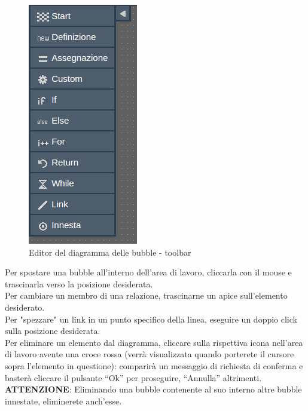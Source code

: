 \documentclass[../ManualeUtente.tex]{subfiles}
\begin{document}
				\begin{figure} [h!]
					\centering
					\includegraphics[scale=0.36]{./Immagini/ToolbarBubbleDiag.png}
					\caption{Editor del diagramma delle bubble - toolbar}\label{fig:ToolbarBubbleDiag}
				\end{figure}
				Per spostare una bubble all'interno dell'area di lavoro,
				cliccarla con il mouse e trascinarla verso la posizione desiderata.\\
				Per cambiare un membro di una relazione, trascinarne un apice sull'elemento
				desiderato.\\
				Per "spezzare" un link in un punto specifico della linea, eseguire un doppio click sulla
				posizione desiderata.\\
				Per eliminare un elemento dal diagramma, cliccare sulla rispettiva icona nell'area di lavoro
				avente una croce rossa (verrà visualizzata quando porterete il cursore sopra l'elemento in
				questione): comparirà un messaggio di richiesta di conferma e basterà cliccare il pulsante ``Ok'' per
				proseguire, ``Annulla'' altrimenti.
				\textbf{ATTENZIONE}: Eliminando una bubble contenente al suo interno altre bubble innestate,
				eliminerete anch'esse.
\end{document}
